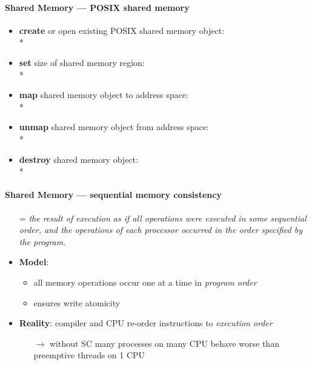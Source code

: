 \paragraph{Shared Memory --- POSIX shared memory}
\begin{itemize}
  \item \textbf{create} or open existing POSIX shared memory object: \\*
  \item \textbf{set} size of shared memory region: \\*
  \item \textbf{map} shared memory object to address space: \\*
  \item \textbf{unmap} shared memory object from address space: \\*
  \item \textbf{destroy} shared memory object: \\*
\end{itemize}

\paragraph{Shared Memory --- sequential memory consistency}
\begin{itemize}
  \item[=] \emph{the result of execution as if all operations were executed in some sequential order, and the operations of each processor occurred in the order specified by the program.}
  \item \textbf{Model}:
  \begin{itemize}
    \item all memory operations occur one at a time in \emph{program order}
    \item ensures write atomicity
  \end{itemize}
  \item \textbf{Reality}: compiler and CPU re-order instructions to \emph{execution order}
  \begin{itemize}
    \item[$ \to $] without SC many processes on many CPU behave worse than preemptive threads on 1 CPU
  \end{itemize}
\end{itemize}

